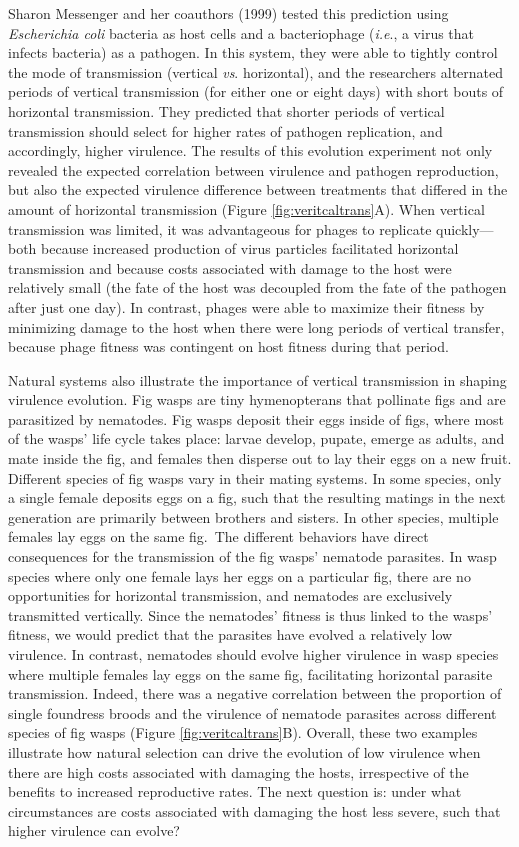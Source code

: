 \documentclass[
]{book}
\begin{document}
Sharon Messenger and her coauthors (1999) tested this prediction using \emph{Escherichia coli} bacteria as host cells and a bacteriophage (\emph{i.e}., a virus that infects bacteria) as a pathogen. In this system, they were able to tightly control the mode of transmission (vertical \emph{vs}. horizontal), and the researchers alternated periods of vertical transmission (for either one or eight days) with short bouts of horizontal transmission. They predicted that shorter periods of vertical transmission should select for higher rates of pathogen replication, and accordingly, higher virulence. The results of this evolution experiment not only revealed the expected correlation between virulence and pathogen reproduction, but also the expected virulence difference between treatments that differed in the amount of horizontal transmission (Figure \ref{fig:veritcaltrans}A). When vertical transmission was limited, it was advantageous for phages to replicate quickly---both because increased production of virus particles facilitated horizontal transmission and because costs associated with damage to the host were relatively small (the fate of the host was decoupled from the fate of the pathogen after just one day). In contrast, phages were able to maximize their fitness by minimizing damage to the host when there were long periods of vertical transfer, because phage fitness was contingent on host fitness during that period.

Natural systems also illustrate the importance of vertical transmission in shaping virulence evolution. Fig wasps are tiny hymenopterans that pollinate figs and are parasitized by nematodes. Fig wasps deposit their eggs inside of figs, where most of the wasps' life cycle takes place: larvae develop, pupate, emerge as adults, and mate inside the fig, and females then disperse out to lay their eggs on a new fruit. Different species of fig wasps vary in their mating systems. In some species, only a single female deposits eggs on a fig, such that the resulting matings in the next generation are primarily between brothers and sisters. In other species, multiple females lay eggs on the same fig.~The different behaviors have direct consequences for the transmission of the fig wasps' nematode parasites. In wasp species where only one female lays her eggs on a particular fig, there are no opportunities for horizontal transmission, and nematodes are exclusively transmitted vertically. Since the nematodes' fitness is thus linked to the wasps' fitness, we would predict that the parasites have evolved a relatively low virulence. In contrast, nematodes should evolve higher virulence in wasp species where multiple females lay eggs on the same fig, facilitating horizontal parasite transmission. Indeed, there was a negative correlation between the proportion of single foundress broods and the virulence of nematode parasites across different species of fig wasps (Figure \ref{fig:veritcaltrans}B). Overall, these two examples illustrate how natural selection can drive the evolution of low virulence when there are high costs associated with damaging the hosts, irrespective of the benefits to increased reproductive rates. The next question is: under what circumstances are costs associated with damaging the host less severe, such that higher virulence can evolve?
\end{document}
